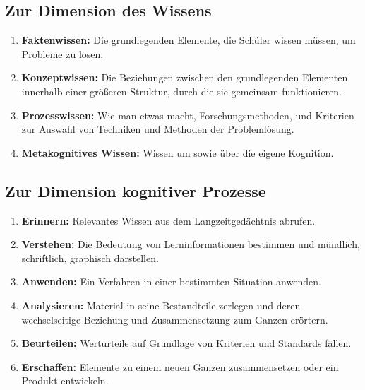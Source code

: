 \subsection{Zur Dimension des Wissens}
\begin{enumerate}[label=\Alph*.]
	\item \textbf{Faktenwissen:} Die grundlegenden Elemente, die Schüler wissen müssen, um Probleme zu lösen.
	\item \textbf{Konzeptwissen:} Die Beziehungen zwischen den grundlegenden Elementen innerhalb einer größeren Struktur, durch die sie gemeinsam funktionieren.
	\item \textbf{Prozesswissen:} Wie man etwas macht, Forschungsmethoden, und Kriterien zur Auswahl von Techniken und Methoden der Problemlösung.
	\item \textbf{Metakognitives Wissen:} Wissen um sowie über die eigene Kognition.
\end{enumerate}

\subsection{Zur Dimension kognitiver Prozesse}
\begin{enumerate}
	\item \textbf{Erinnern:} Relevantes Wissen aus dem Langzeitgedächtnis abrufen.
	\item \textbf{Verstehen:} Die Bedeutung von Lerninformationen bestimmen und mündlich, schriftlich, graphisch darstellen.
	\item \textbf{Anwenden:} Ein Verfahren in einer bestimmten Situation anwenden.
	\item \textbf{Analysieren:} Material in seine Bestandteile zerlegen und deren wechselseitige Beziehung und Zusammensetzung zum Ganzen erörtern.
	\item \textbf{Beurteilen:} Werturteile auf Grundlage von Kriterien und Standards fällen.
	\item \textbf{Erschaffen:} Elemente zu einem neuen Ganzen zusammensetzen oder ein Produkt entwickeln.
\end{enumerate}

